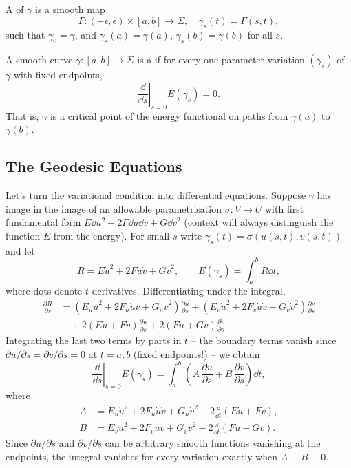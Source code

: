\documentclass[a4paper]{scrartcl}
\begin{document}
\begin{definition}[Variation]
    A  of $\gamma$ is a smooth map
    $$
    \Gamma: (-\epsilon, \epsilon) \times [a, b] \rightarrow \Sigma, \quad \gamma_s(t) = \Gamma(s, t),
    $$
    such that $\gamma_0 = \gamma$, and $\gamma_s(a) = \gamma(a)$, $\gamma_s(b) = \gamma(b)$ for all $s$.
\end{definition}

\begin{definition}[Geodesic]
    A smooth curve $\gamma: [a, b] \rightarrow \Sigma$ is a  if for every one-parameter variation $(\gamma_s)$ of $\gamma$ with fixed endpoints,
    $$
    \left.\frac{\dd}{\dd s}\right|_{s = 0} E(\gamma_s) = 0.
    $$
    That is, $\gamma$ is a critical point of the energy functional on paths from $\gamma(a)$ to $\gamma(b)$.
\end{definition}

\subsection{The Geodesic Equations}

Let's turn the variational condition into differential equations. Suppose $\gamma$ has image in the image of an allowable parametrisation $\sigma: V \rightarrow U$ with first fundamental form $E \dd u^2 + 2F \dd u \dd v + G \dd v^2$ (context will always distinguish the function $E$ from the energy). For small $s$ write $\gamma_s(t) = \sigma(u(s,t), v(s,t))$ and let
$$
R = E \dot u^2 + 2F \dot u \dot v + G \dot v^2, \qquad E(\gamma_s) = \int_a^b R \dd t,
$$
where dots denote $t$-derivatives. Differentiating under the integral,
\begin{align*}
    \frac{\partial R}{\partial s} &= \left(E_u \dot u^2 + 2F_u \dot u \dot v + G_u \dot v^2\right)\frac{\partial u}{\partial s} + \left(E_v \dot u^2 + 2F_v \dot u \dot v + G_v \dot v^2\right)\frac{\partial v}{\partial s} \\
    &\quad + 2\left(E \dot u + F \dot v\right) \frac{\partial \dot u}{\partial s} + 2\left(F \dot u + G \dot v\right)\frac{\partial \dot v}{\partial s}.
\end{align*}
Integrating the last two terms by parts in $t$ -- the boundary terms vanish since $\partial u/\partial s = \partial v /\partial s = 0$ at $t = a, b$ (fixed endpoints!) -- we obtain
$$
\left.\frac{\dd}{\dd s}\right|_{s=0} E(\gamma_s) = \int_a^b \left(A \, \frac{\partial u}{\partial s} + B \, \frac{\partial v}{\partial s}\right) \dd t,
$$
where
\begin{align*}
    A &= E_u \dot u^2 + 2 F_u \dot u \dot v + G_u \dot v^2 - 2 \frac{\dd}{\dd t}\left(E \dot u + F \dot v\right), \\
    B &= E_v \dot u^2 + 2F_v \dot u \dot v + G_v \dot v^2 - 2\frac{\dd}{\dd t}\left(F \dot u + G \dot v\right).
\end{align*}
Since $\partial u/\partial s$ and $\partial v/\partial s$ can be arbitrary smooth functions vanishing at the endpoints, the integral vanishes for every variation exactly when $A \equiv B \equiv 0$.
\end{document}
